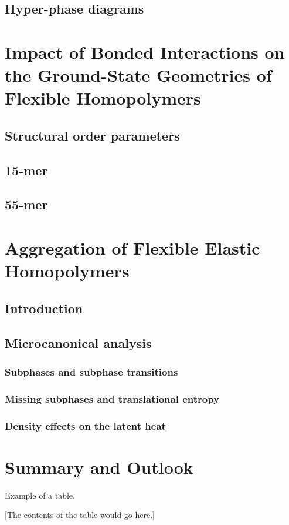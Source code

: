 \documentclass[12pt]{report}
\begin{document}
\section{Hyper-phase diagrams}

\chapter{Impact of Bonded Interactions on the Ground-State Geometries of Flexible Homopolymers}
\section{Structural order parameters}
\section{15-mer}
\section{55-mer}

\chapter{Aggregation of Flexible Elastic Homopolymers}
\section{Introduction}
\section{Microcanonical analysis}
\subsection{Subphases and subphase transitions}
\subsection{Missing subphases and translational entropy}
\subsection{Density effects on the latent heat}

\chapter{Summary and Outlook}











\begin{table}
\caption{Example of a table.}
\centerline{[The contents of the table would go here.]}
\end{table}



\begin{thebibliography}{99}
        
\end{thebibliography}
\end{document}
